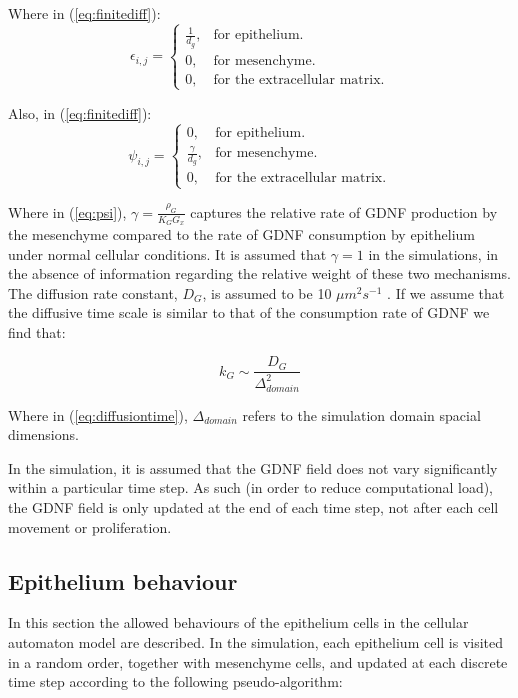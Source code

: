\documentclass[pdftex,10pt,a4paper,twocolumn]{article}
\begin{document}
Where in (\ref{eq:finitediff}):
\begin{equation}
\epsilon_{i,j} =\begin{cases}
\frac{1}{d_g}, & \text{for epithelium}.\\
0, & \text{for mesenchyme}.\\
0, & \text{for the extracellular matrix}.
\end{cases}
\end{equation}

Also, in (\ref{eq:finitediff}):
\begin{equation} \label{eq:psi}
\psi_{i,j} =\begin{cases}
0, & \text{for epithelium}.\\
\frac{\gamma}{d_g}, & \text{for mesenchyme}.\\
0, & \text{for the extracellular matrix}.
\end{cases}
\end{equation}

Where in (\ref{eq:psi}), $\gamma = \frac{\rho_G}{K_G G_x}$ captures the relative rate of GDNF production by the mesenchyme compared to the rate of GDNF consumption by epithelium under normal cellular conditions. It is assumed that $\gamma = 1$ in the simulations, in the absence of information regarding the relative weight of these two mechanisms. The diffusion rate constant, $D_G$, is assumed to be 10 $\mu m^2 s^{-1}$ \cite{MenshykauDIber}. If we assume that the diffusive time scale is similar to that of the consumption rate of GDNF we find that:

\begin{equation}\label{eq:diffusiontime}
k_G \sim \frac{D_G}{\Delta_{domain}^2} 
\end{equation}

Where in (\ref{eq:diffusiontime}), $\Delta_{domain}$ refers to the simulation domain spacial dimensions. 

In the simulation, it is assumed that the GDNF field does not vary significantly within a particular time step. As such (in order to reduce computational load), the GDNF field is only updated at the end of each time step, not after each cell movement or proliferation.

\subsection{Epithelium behaviour}
In this section the allowed behaviours of the epithelium cells in the cellular automaton model are described. In the simulation, each epithelium cell is visited in a random order, together with mesenchyme cells, and updated at each discrete time step according to the following pseudo-algorithm:
\end{document}
